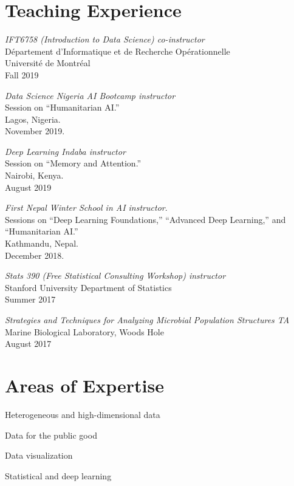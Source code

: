 \documentclass[letterpaper]{article}
\renewenvironment{itemize}{
  \begin{list}{}{
    \setlength{\leftmargin}{1.5em}
  }
}{
  \end{list}
}
\begin{document}
\section*{Teaching Experience}
\begin{itemize}
\item \textit{IFT6758 (Introduction to Data Science) co-instructor} \\
D\'epartement d'Informatique et de Recherche Op\'erationnelle \\
Universit\'e de Montr\'eal \\
Fall 2019 
\item \textit{Data Science Nigeria AI Bootcamp instructor} \\
Session on ``Humanitarian AI.'' \\
Lagos, Nigeria. \\
November 2019.
\item \textit{Deep Learning Indaba instructor} \\
Session on ``Memory and Attention.'' \\
Nairobi, Kenya. \\
August 2019
\item \textit{First Nepal Winter School in AI instructor}. \\
Sessions on ``Deep Learning Foundations,'' ``Advanced Deep Learning,'' and ``Humanitarian AI.'' \\
Kathmandu, Nepal. \\
December 2018.
\item \textit{Stats 390 (Free Statistical Consulting Workshop) instructor} \\
  Stanford University Department of Statistics \\
  Summer 2017 
\item \textit{Strategies and Techniques for Analyzing Microbial Population Structures TA} \\
  Marine Biological Laboratory, Woods Hole\\
  August 2017
\end{itemize}

\section*{Areas of Expertise}
\begin{itemize}
  \item Heterogeneous and high-dimensional data
  \item Data for the public good
  \item Data visualization
  \item Statistical and deep learning
\end{itemize}
\end{document}
